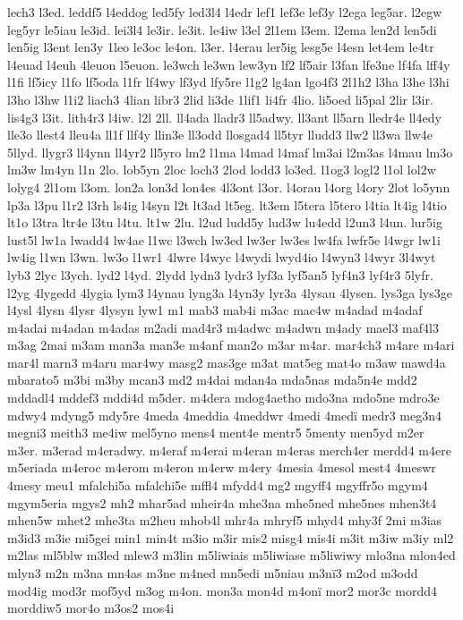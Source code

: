 {lech3
l3ed.
leddf5
l4eddog
led5fy
led3l4
l4edr
lef1
lef3e
lef3y
l2ega
leg5ar.
l2egw
leg5yr
le5iau
le3id.
lei3l4
le3ir.
le3it.
le4iw
l3el
2l1em
l3em.
l2ema
len2d
len5di
len5ig
l3ent
len3y
1leo
le3oc
le4on.
l3er.
l4erau
ler5ig
lesg5e
l4esn
let4em
le4tr
l4euad
l4euh
4leuon
l5euon.
le3wch
le3wn
lew3yn
lf2
lf5air
l3fan
lfe3ne
lf4fa
lff4y
l1fi
lf5icy
l1fo
lf5oda
l1fr
lf4wy
lf3yd
lfy5re
l1g2
lg4an
lgo4f3
2l1h2
l3ha
l3he
l3hi
l3ho
l3hw
l1i2
liach3
4lian
libr3
2lid
li3de
1lif1
li4fr
4lio.
li5oed
li5pal
2lir
l3ir.
lis4g3
l3it.
lith4r3
l4iw.
l2l
2ll.
ll4ada
lladr3
ll5adwy.
ll3ant
ll5arn
lledr4e
ll4edy
lle3o
llest4
lleu4a
ll1f
llf4y
llin3e
ll3odd
llosgad4
ll5tyr
lludd3
llw2
ll3wa
llw4e
5llyd.
llygr3
ll4ynn
ll4yr2
ll5yro
lm2
l1ma
l4mad
l4maf
lm3ai
l2m3as
l4mau
lm3o
lm3w
lm4yn
l1n
2lo.
lob5yn
2loc
loch3
2lod
lodd3
lo3ed.
l1og3
logl2
l1ol
lol2w
lolyg4
2l1om
l3om.
lon2a
lon3d
lon4es
4l3ont
l3or.
l4orau
l4org
l4ory
2lot
lo5ynn
lp3a
l3pu
l1r2
l3rh
ls4ig
l4syn
l2t
lt3ad
lt5eg.
lt3em
l5tera
l5tero
l4tia
lt4ig
l4tio
lt1o
l3tra
ltr4e
l3tu
l4tu.
lt1w
2lu.
l2ud
ludd5y
lud3w
lu4edd
l2un3
l4un.
lur5ig
lust5l
lw1a
lwadd4
lw4ae
l1wc
l3wch
lw3ed
lw3er
lw3es
lw4fa
lwfr5e
l4wgr
lw1i
lw4ig
l1wn
l3wn.
lw3o
l1wr1
4lwre
l4wyc
l4wydi
lwyd4io
l4wyn3
l4wyr
3l4wyt
lyb3
2lyc
l3ych.
lyd2
l4yd.
2lydd
lydn3
lydr3
lyf3a
lyf5an5
lyf4n3
lyf4r3
5lyfr.
l2yg
4lygedd
4lygia
lym3
l4ynau
lyng3a
l4yn3y
lyr3a
4lysau
4lysen.
lys3ga
lys3ge
l4ysl
4lysn
4lysr
4lysyn
lyw1
m1
mab3
mab4i
m3ac
mac4w
m4adad
m4adaf
m4adai
m4adan
m4adas
m2adi
mad4r3
m4adwc
m4adwn
m4ady
mael3
maf4l3
m3ag
2mai
m3am
man3a
man3e
m4anf
man2o
m3ar
m4ar.
mar4ch3
m4are
m4ari
mar4l
marn3
m4aru
mar4wy
masg2
mas3ge
m3at
mat5eg
mat4o
m3aw
mawd4a
mbarato5
m3bi
m3by
mcan3
md2
m4dai
mdan4a
mda5nas
mda5n4e
mdd2
mddadl4
mddef3
mddi4d
m5der.
m4dera
mdog4aetho
mdo3na
mdo5ne
mdro3e
mdwy4
mdyng5
mdy5re
4meda
4meddia
4meddwr
4medi
4medï
medr3
meg3n4
megni3
meith3
me4iw
mel5yno
mens4
ment4e
mentr5
5menty
men5yd
m2er
m3er.
m3erad
m4eradwy.
m4eraf
m4erai
m4eran
m4eras
merch4er
merdd4
m4ere
m5eriada
m4eroc
m4erom
m4eron
m4erw
m4ery
4mesia
4mesol
mest4
4meswr
4mesy
meu1
mfalchi5a
mfalchi5e
mffl4
mfydd4
mg2
mgyff4
mgyffr5o
mgym4
mgym5eria
mgys2
mh2
mhar5ad
mheir4a
mhe3na
mhe5ned
mhe5nes
mhen3t4
mhen5w
mhet2
mhe3ta
m2heu
mhob4l
mhr4a
mhryf5
mhyd4
mhy3f
2mi
m3ias
m3id3
m3ie
mi5gei
min1
min4t
m3io
m3ir
mis2
misg4
mis4i
m3it
m3iw
m3iy
ml2
m2las
ml5blw
m3led
mlew3
m3lin
m5liwiais
m5liwiase
m5liwiwy
mlo3na
mlon4ed
mlyn3
m2n
m3na
mn4as
m3ne
m4ned
mn5edi
m5niau
m3nï3
m2od
m3odd
mod4ig
mod3r
mof5yd
m3og
m4on.
mon3a
mon4d
m4onï
mor2
mor3c
mordd4
morddiw5
mor4o
m3os2
mos4i
}
